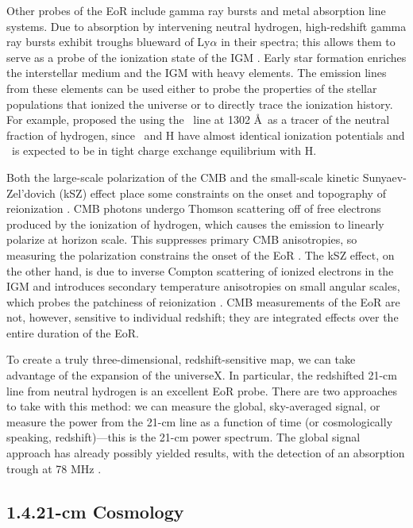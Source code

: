 \documentclass[12pt]{article}
\begin{document}
Other probes of the EoR include gamma ray bursts and metal absorption line systems. Due to absorption by intervening neutral hydrogen, high-redshift gamma ray bursts exhibit troughs blueward of Ly$\alpha$ in their spectra; this allows them to serve as a probe of the ionization state of the IGM \citep[e.g.,][]{gallerani2008}. Early star formation enriches the interstellar medium and the IGM with heavy elements. The emission lines from these elements can be used either to probe the properties of the stellar populations that ionized the universe or to directly trace the ionization history. For example, \cite{oh2002} proposed the using the \OI~line at 1302 \AA~as a tracer of the neutral fraction of hydrogen, since \OI~and H have almost identical ionization potentials and \OI~is expected to be in tight charge exchange equilibrium with H.

Both the large-scale polarization of the CMB and the small-scale kinetic Sunyaev-Zel'dovich (kSZ) effect place some constraints on the onset and topography of reionization \citep{fan2006}. CMB photons undergo Thomson scattering off of free electrons produced by the ionization of hydrogen, which causes the emission to linearly polarize at horizon scale. This suppresses primary CMB anisotropies, so measuring the polarization constrains the onset of the EoR \citep[e.g.,][]{zaldarriaga1997, roy2018}. The kSZ effect, on the other hand, is due to inverse Compton scattering of ionized electrons in the IGM and introduces secondary temperature anisotropies on small angular scales, which probes the patchiness of reionization \citep{fan2006, park2013, roy2018}. CMB measurements of the EoR are not, however, sensitive to individual redshift; they are integrated effects over the entire duration of the EoR.

To create a truly three-dimensional, redshift-sensitive map, we can take advantage of the expansion of the universeX. In particular, the redshifted 21-cm line from neutral hydrogen is an excellent EoR probe. There are two approaches to take with this method: we can measure the global, sky-averaged signal, or measure the power from the 21-cm line as a function of time (or cosmologically speaking, redshift)---this is the 21-cm power spectrum. The global signal approach has already possibly yielded results, with the detection of an absorption trough at 78 MHz \citep{bowman2018}. \vspace{3mm}

\tocless\subsection{\hypertarget{subsec:21cm}{1.4.\hspace{0.75em}21-cm Cosmology}}
\end{document}
